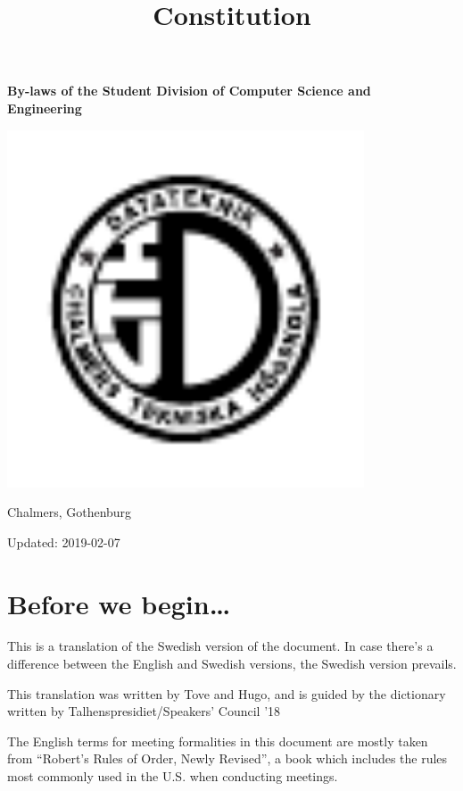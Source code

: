 \documentclass[a4paper]{dtek}
\title{Constitution}
\newcommand{\sdocsae}{Student Division of Computer Science and Engineering~}
\newcommand{\updated}{2019-02-07} %
\begin{document}
\makeheadfoot

\vspace*{\fill}
\begin{center}
{\Huge \textbf{By-laws of the \sdocsae}}
\par\bigskip
\includegraphics[width=300pt]{dteklogo.pdf}
\par\bigskip
{\LARGE Chalmers, Gothenburg}
\end{center}
\vspace*{\fill}
\begin{center}
{\LARGE Updated: \updated}
\end{center}
\vspace*{\fill}


\newpage
\setcounter{tocdepth}{1}
\tableofcontents
\newpage


\setcounter{section}{-1}
\section{Before we begin\dots}
This is a translation of the Swedish version of the document. In case there's a difference between the English and Swedish versions, the Swedish version prevails.

This translation was written by Tove and Hugo, and is guided by the dictionary written by Talhenspresidiet/Speakers' Council '18

The English terms for meeting formalities in this document are mostly taken from ``Robert's Rules of Order, Newly Revised'', a book which includes the rules most commonly used in the U.S. when conducting meetings.

\newpage

\end{document}
